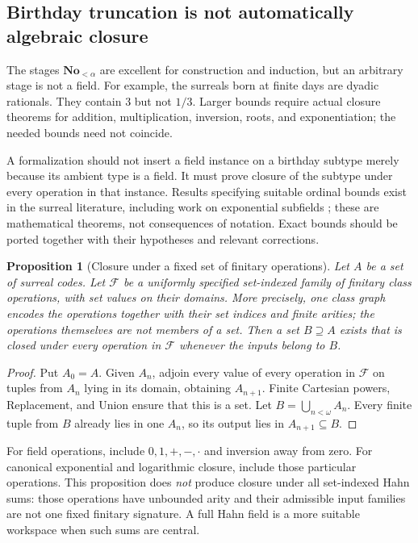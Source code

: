 \documentclass[11pt,letterpaper]{article}
\numberwithin{equation}{section}
\newtheorem{proposition}[theorem]{Proposition}
\theoremstyle{definition}
\theoremstyle{remark}
\newcommand{\No}{\mathbf{No}}
\begin{document}
\subsection{Birthday truncation is not automatically algebraic closure}
The stages $\No_{<\alpha}$ are excellent for construction and induction, but an arbitrary stage is not a field. For example, the surreals born at finite days are dyadic rationals. They contain $3$ but not $1/3$. Larger bounds require actual closure theorems for addition, multiplication, inversion, roots, and exponentiation; the needed bounds need not coincide.

A formalization should not insert a field instance on a birthday subtype merely because its ambient type is a field. It must prove closure of the subtype under every operation in that instance. Results specifying suitable ordinal bounds exist in the surreal literature, including work on exponential subfields \cite{vdDE,EKExp}; these are mathematical theorems, not consequences of notation. Exact bounds should be ported together with their hypotheses and relevant corrections.

\begin{proposition}[Closure under a fixed set of finitary operations]\label{prop:closure}
Let $A$ be a set of surreal codes. Let $\mathcal F$ be a uniformly specified set-indexed family of finitary class operations, with set values on their domains. More precisely, one class graph encodes the operations together with their set indices and finite arities; the operations themselves are not members of a set. Then a set $B\supseteq A$ exists that is closed under every operation in $\mathcal F$ whenever the inputs belong to $B$.
\end{proposition}
\begin{proof}
Put $A_0=A$. Given $A_n$, adjoin every value of every operation in $\mathcal F$ on tuples from $A_n$ lying in its domain, obtaining $A_{n+1}$. Finite Cartesian powers, Replacement, and Union ensure that this is a set. Let $B=\bigcup_{n<\omega}A_n$. Every finite tuple from $B$ already lies in one $A_n$, so its output lies in $A_{n+1}\subseteq B$.
\end{proof}

For field operations, include $0,1,+,-,\cdot$ and inversion away from zero. For canonical exponential and logarithmic closure, include those particular operations. This proposition does \emph{not} produce closure under all set-indexed Hahn sums: those operations have unbounded arity and their admissible input families are not one fixed finitary signature. A full Hahn field is a more suitable workspace when such sums are central.
\end{document}
